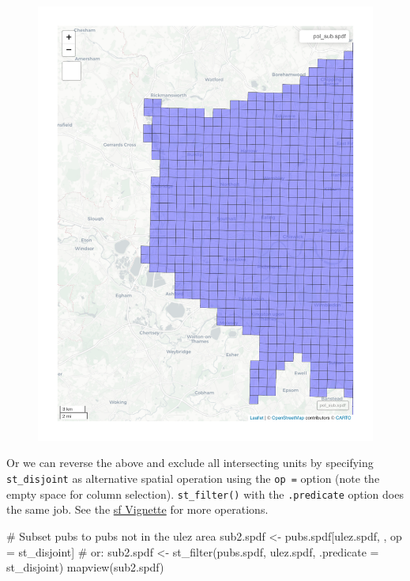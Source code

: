 \documentclass[
  letterpaper,
]{scrbook}
\newenvironment{Shaded}{\begin{snugshade}}{\end{snugshade}}
\newcommand{\AttributeTok}[1]{\textcolor[rgb]{0.40,0.45,0.13}{#1}}
\newcommand{\CommentTok}[1]{\textcolor[rgb]{0.37,0.37,0.37}{#1}}
\newcommand{\FunctionTok}[1]{\textcolor[rgb]{0.28,0.35,0.67}{#1}}
\newcommand{\NormalTok}[1]{\textcolor[rgb]{0.00,0.23,0.31}{#1}}
\newcommand{\OtherTok}[1]{\textcolor[rgb]{0.00,0.23,0.31}{#1}}
\begin{document}
\begin{figure}[H]

{\centering \includegraphics{02_spatial-data_files/figure-pdf/unnamed-chunk-7-1.pdf}

}

\end{figure}

Or we can reverse the above and exclude all intersecting units by
specifying \texttt{st\_disjoint} as alternative spatial operation using
the \texttt{op\ =} option (note the empty space for column selection).
\texttt{st\_filter()} with the \texttt{.predicate} option does the same
job. See the
\href{https://cran.r-project.org/web/packages/sf/vignettes/sf3.html}{sf
Vignette} for more operations.

\begin{Shaded}
\begin{Highlighting}[]
\CommentTok{\# Subset pubs to pubs not in the ulez area}
\NormalTok{sub2.spdf }\OtherTok{\textless{}{-}}\NormalTok{ pubs.spdf[ulez.spdf, , op }\OtherTok{=}\NormalTok{ st\_disjoint] }\CommentTok{\# or:}
\NormalTok{sub2.spdf }\OtherTok{\textless{}{-}} \FunctionTok{st\_filter}\NormalTok{(pubs.spdf, ulez.spdf, }\AttributeTok{.predicate =}\NormalTok{ st\_disjoint)}
\FunctionTok{mapview}\NormalTok{(sub2.spdf)}
\end{Highlighting}
\end{Shaded}
\end{document}

